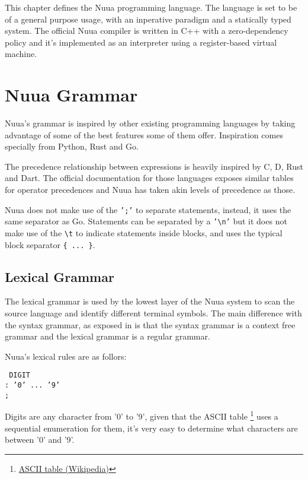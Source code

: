 This chapter defines the Nuua programming language. The language is set to be of a general purpose usage, with an inperative
paradigm and a statically typed system. The official Nuua compiler is written in C++ with a zero-dependency policy and it's
implemented as an interpreter using a register-based virtual machine.

\section{Nuua Grammar}

Nuua's grammar is inspired by other existing programming languages by taking advantage of some of the best features some of them offer.
Inspiration comes specially from Python, Rust and Go.

The precedence relationship between expressions is heavily inspired by C, D, Rust and Dart. The official documentation for those languages
exposes similar tables for operator precedences and Nuua has taken akin levels of precedence as those.

Nuua does not make use of the \texttt{';'} to separate statements, instead, it uses the same separator as Go. Statements can be separated by
a \texttt{'\textbackslash n'} but it does not make use of the \texttt{\textbackslash t} to indicate statements inside blocks, and uses the typical
block separator \texttt{\{ ... \}}.

\subsection{Lexical Grammar}

The lexical grammar is used by the lowest layer of the Nuua system to scan the source language and identify different terminal symbols.
The main difference with the syntax grammar, as exposed in \autocite[Appendix~I]{crafting_interpreters} is that the syntax grammar is a
context free grammar and the lexical grammar is a regular grammar.

Nuua's lexical rules are as follors:

\texttt{
    DIGIT\\
        \tab: '0' ... '9'\\
        \tab;
}

Digits are any character from '0' to '9', given that the ASCII table \footnote{\href{https://en.wikipedia.org/wiki/ASCII}{ASCII table (Wikipedia)}} uses
a sequential enumeration for them, it's very easy to determine what characters are between '0' and '9'.

